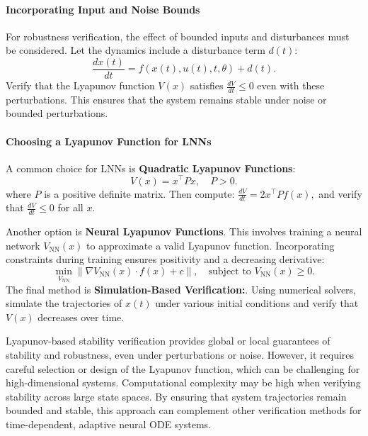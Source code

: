 \paragraph{Incorporating Input and Noise Bounds}
For robustness verification, the effect of bounded inputs and disturbances must be considered. Let the dynamics include a disturbance term \(d(t)\):
\[
\frac{dx(t)}{dt} = f(x(t), u(t), t, \theta) + d(t).
\]
Verify that the Lyapunov function \(V(x)\) satisfies \(\frac{dV}{dt} \leq 0\) even with these perturbations. This ensures that the system remains stable under noise or bounded perturbations.

\paragraph{Choosing a Lyapunov Function for LNNs}
A common choice for LNNs is \textbf{Quadratic Lyapunov Functions}:
    \[
    V(x) = x^\top P x, \quad P > 0.
    \]
    where \(P\) is a positive definite matrix.
Then compute:
    \(
    \frac{dV}{dt} = 2x^\top P f(x),
    \)
    and verify that \(\frac{dV}{dt} \leq 0\) for all \(x\).


Another option is \textbf{Neural Lyapunov Functions}. This involves training a neural network \(V_\text{NN}(x)\) to approximate a valid Lyapunov function. Incorporating constraints during training ensures positivity and a decreasing derivative:
    \[
    \min_{V_\text{NN}} \| \nabla V_\text{NN}(x) \cdot f(x) + c \|, \quad \text{subject to } V_\text{NN}(x) \geq 0.
    \]
The final method is \textbf{Simulation-Based Verification:}. Using numerical solvers, simulate the trajectories of \(x(t)\) under various initial conditions and verify that \(V(x)\) decreases over time.

Lyapunov-based stability verification provides global or local guarantees of stability and robustness, even under perturbations or noise. However, it requires careful selection or design of the Lyapunov function, which can be challenging for high-dimensional systems. Computational complexity may be high when verifying stability across large state spaces. By ensuring that system trajectories remain bounded and stable, this approach can complement other verification methods for time-dependent, adaptive neural ODE systems. \cite{regoLyapunovbasedContinuoustimeNonlinear2022}